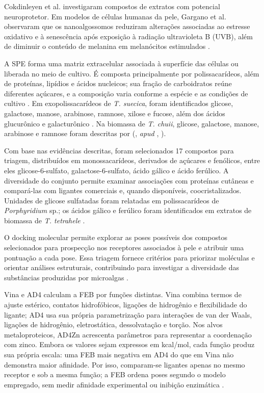 Cokdinleyen et al. investigaram compostos de extratos com potencial neuroprotetor. Em modelos de células humanas da pele, Gargano et al. observaram que os nanoalgossomos reduziram alterações associadas ao estresse oxidativo e à senescência após exposição à radiação ultravioleta B (UVB), além de diminuir o conteúdo de melanina em melanócitos estimulados \parencite{adamo2024,cokdinleyen2024,gargano2026}. 

A SPE forma uma matriz extracelular associada à superfície das células ou liberada no meio de cultivo. É composta principalmente por polissacarídeos, além de proteínas, lipídios e ácidos nucleicos; sua fração de carboidratos reúne diferentes açúcares, e a composição varia conforme a espécie e as condições de cultivo \parencite{delattre2016}. Em exopolissacarídeos de \textit{T. suecica}, foram identificados glicose, galactose, manose, arabinose, ramnose, xilose e fucose, além dos ácidos glucurônico e galacturônico \parencite{parra2020}. Na biomassa de \textit{T. chuii}, glicose, galactose, manose, arabinose e ramnose foram descritas por \citeauthor{brown1991} (\citeyear{brown1991}, \textit{apud} \citeauthor{pereira2019}, \citeyear{pereira2019}).

Com base nas evidências descritas, foram selecionados 17 compostos para triagem, distribuídos em monossacarídeos, derivados de açúcares e fenólicos, entre eles glicose-6-sulfato, galactose-6-sulfato, ácido gálico e ácido ferúlico. A diversidade do conjunto permite examinar associações com proteínas cutâneas e compará-las com ligantes comerciais e, quando disponíveis, coocristalizados. Unidades de glicose sulfatadas foram relatadas em polissacarídeos de \textit{Porphyridium} sp.; os ácidos gálico e ferúlico foram identificados em extratos de biomassa de \textit{T. tetrahele} \parencite{geresh2009,mai2026}.

O docking molecular permite explorar as poses possíveis dos compostos selecionados para prospecção nos receptores associados à pele e atribuir uma pontuação a cada pose. Essa triagem fornece critérios para priorizar moléculas e orientar análises estruturais, contribuindo para investigar a diversidade das substâncias produzidas por microalgas \parencite{khemiri2023,trott2010,warren2006}.

Vina e AD4 calculam a FEB por funções distintas. Vina combina termos de ajuste estérico, contatos hidrofóbicos, ligações de hidrogênio e flexibilidade do ligante; AD4 usa sua própria parametrização para interações de van der Waals, ligações de hidrogênio, eletrostática, dessolvatação e torção. Nos alvos metaloproteicos, AD4Zn acrescenta parâmetros para representar a coordenação com zinco. Embora os valores sejam expressos em kcal/mol, cada função produz sua própria escala: uma FEB mais negativa em AD4 do que em Vina não demonstra maior afinidade. Por isso, comparam-se ligantes apenas no mesmo receptor e sob a mesma função; a FEB ordena poses segundo o modelo empregado, sem medir afinidade experimental ou inibição enzimática \parencite{morris2009autodock,santos2014zn,trott2010,warren2006}.

